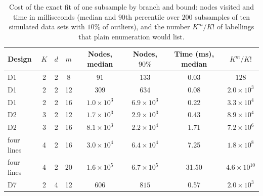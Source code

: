 \begin{table}[htbp]
\centering
\small
\caption{Cost of the exact fit of one subsample by branch and bound: nodes visited and time in milliseconds (median and $90$th percentile over $200$ subsamples of ten simulated data sets with $10\%$ of outliers), and the number $K^{m}/K!$ of labellings that plain enumeration would list.}
\label{tab:bb}
\begin{tabular}{lccccccc}
\toprule
Design & $K$ & $d$ & $m$ & Nodes, median & Nodes, $90\%$ & Time (ms), median & $K^{m}/K!$ \\
\midrule
D1 & 2 & 2 & 8 & $91$ & $133$ & 0.03 & $128$ \\
D1 & 2 & 2 & 12 & $309$ & $634$ & 0.08 & $2.0\times10^{3}$ \\
D1 & 2 & 2 & 16 & $1.0\times10^{3}$ & $6.9\times10^{3}$ & 0.22 & $3.3\times10^{4}$ \\
D2 & 3 & 2 & 12 & $1.7\times10^{3}$ & $2.9\times10^{3}$ & 0.43 & $8.9\times10^{4}$ \\
D2 & 3 & 2 & 16 & $8.1\times10^{3}$ & $2.2\times10^{4}$ & 1.71 & $7.2\times10^{6}$ \\
four lines & 4 & 2 & 16 & $3.0\times10^{4}$ & $6.4\times10^{4}$ & 7.25 & $1.8\times10^{8}$ \\
four lines & 4 & 2 & 20 & $1.6\times10^{5}$ & $6.7\times10^{5}$ & 31.50 & $4.6\times10^{10}$ \\
D7 & 2 & 4 & 12 & $606$ & $815$ & 0.57 & $2.0\times10^{3}$ \\
\bottomrule
\end{tabular}
\end{table}